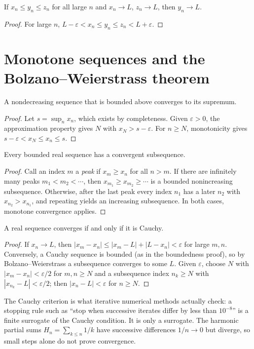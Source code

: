 \begin{proposition}[Squeeze]
If $x_n\le y_n\le z_n$ for all large $n$ and $x_n\to L$, $z_n\to L$, then $y_n\to L$.
\end{proposition}
\begin{proof}
For large $n$, $L-\varepsilon<x_n\le y_n\le z_n<L+\varepsilon$.
\end{proof}

\section{Monotone sequences and the Bolzano--Weierstrass theorem}
\begin{theorem}
A nondecreasing sequence that is bounded above converges to its supremum.
\end{theorem}
\begin{proof}
Let $s=\sup_nx_n$, which exists by completeness. Given $\varepsilon>0$, the approximation property gives $N$ with $x_N>s-\varepsilon$. For $n\ge N$, monotonicity gives $s-\varepsilon<x_N\le x_n\le s$.
\end{proof}

\begin{theorem}
Every bounded real sequence has a convergent subsequence.
\end{theorem}
\begin{proof}
Call an index $m$ a \emph{peak} if $x_m\ge x_n$ for all $n>m$. If there are infinitely many peaks $m_1<m_2<\cdots$, then $x_{m_1}\ge x_{m_2}\ge\cdots$ is a bounded nonincreasing subsequence. Otherwise, after the last peak every index $n_1$ has a later $n_2$ with $x_{n_2}>x_{n_1}$, and repeating yields an increasing subsequence. In both cases, monotone convergence applies.
\end{proof}

\begin{theorem}
A real sequence converges if and only if it is Cauchy.
\end{theorem}
\begin{proof}
If $x_n\to L$, then $|x_m-x_n|\le|x_m-L|+|L-x_n|<\varepsilon$ for large $m,n$. Conversely, a Cauchy sequence is bounded (as in the boundedness proof), so by Bolzano--Weierstrass a subsequence converges to some $L$. Given $\varepsilon$, choose $N$ with $|x_m-x_n|<\varepsilon/2$ for $m,n\ge N$ and a subsequence index $n_k\ge N$ with $|x_{n_k}-L|<\varepsilon/2$; then $|x_n-L|<\varepsilon$ for $n\ge N$.
\end{proof}
The Cauchy criterion is what iterative numerical methods actually check: a stopping rule such as ``stop when successive iterates differ by less than $10^{-8}$'' is a finite surrogate of the Cauchy condition. It is only a surrogate. The harmonic partial sums $H_n=\sum_{k\le n}1/k$ have successive differences $1/n\to0$ but diverge, so small steps alone do not prove convergence.

